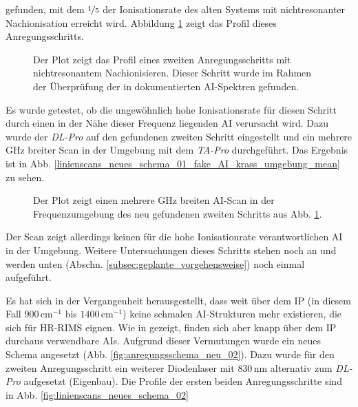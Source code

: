 gefunden, mit dem $\nicefrac{1}{5}$ der Ionisationsrate des alten Systems mit
nichtresonanter Nachionisation erreicht wird. Abbildung
\ref{fig:linienscans_neues_schema_01_fake_AI_krass_mean} zeigt das Profil dieses
Anregungsschritts.
\begin{figure}[h]
 	\centering
 	\footnotesize
	
	\caption[zweiter Schritt @ xxxx aus AI-Spektren]{Der Plot zeigt das Profil
	eines zweiten Anregungsschritts mit nichtresonantem Nachionisieren. Dieser Schritt wurde im
	Rahmen der Überprüfung der in \cite{raeder:2011:dissertation} dokumentierten
	AI-Spektren gefunden.}
	\label{fig:linienscans_neues_schema_01_fake_AI_krass_mean}
\end{figure}
Es wurde getestet, ob die ungewöhnlich hohe Ionisationsrate für
diesen Schritt durch einen in der Nähe dieser Frequenz liegenden AI verursacht
wird. Dazu wurde der \textit{DL-Pro} auf den gefundenen zweiten Schritt
eingestellt und ein mehrere GHz breiter Scan in der Umgebung mit dem \textit{TA-Pro} durchgeführt.
Das Ergebnis ist in Abb.
\ref{linienscans_neues_schema_01_fake_AI_krass_umgebung_mean} zu sehen.
\begin{figure}[h]
 	\centering
 	\footnotesize
	
	\caption[zweiter Schritt aus AI-Spektren, Umgebungsscan]{Der Plot zeigt
	einen mehrere GHz breiten AI-Scan in der Frequenzumgebung des neu
	gefundenen zweiten Schritts aus Abb.
	\ref{fig:linienscans_neues_schema_01_fake_AI_krass_mean}.}
	\label{fig:linienscans_neues_schema_01_fake_AI_krass_umgebung_mean}
\end{figure}
Der Scan zeigt allerdings keinen für die hohe Ionisationrate verantwortlichen AI
in der Umgebung. Weitere Untersuchungen dieses
Schritts stehen noch an und werden unten (Abschn. \ref{subsec:geplante_vorgehensweise}) noch einmal
aufgeführt.\par Es hat sich in der Vergangenheit herausgestellt, dass weit
über dem IP (in diesem Fall $900\,$cm$^{-1}$ bis $1400\,$cm$^{-1}$) keine
schmalen AI-Strukturen mehr existieren, die sich für HR-RIMS eignen. Wie in
\cite{Bushaw2007485} gezeigt, finden sich aber knapp über dem IP durchaus verwendbare AIs.
Aufgrund dieser Vermutungen wurde ein neues Schema angesetzt
(Abb. \ref{fig:anregungsschema_neu_02}). Dazu wurde für den zweiten
Anregungsschritt ein weiterer Diodenlaser mit $830\,$nm alternativ zum
\textit{DL-Pro} aufgesetzt (Eigenbau). Die Profile der ersten beiden
Anregungsschritte sind in Abb. \ref{fig:linienscans_neues_schema_02}

